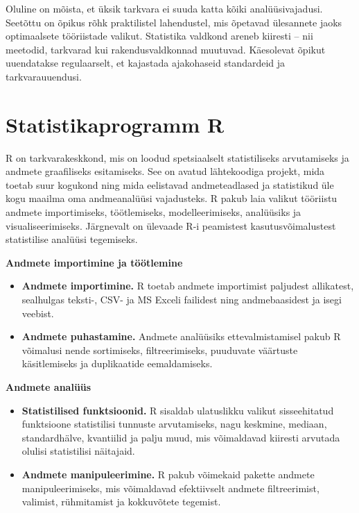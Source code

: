 \documentclass[
]{book}
\providecommand{\tightlist}{%
  \setlength{\itemsep}{0pt}\setlength{\parskip}{0pt}}
\theoremstyle{definition}
\theoremstyle{definition}
\theoremstyle{definition}
\theoremstyle{definition}
\theoremstyle{remark}
\begin{document}
Oluline on mõista, et üksik tarkvara ei suuda katta kõiki analüüsivajadusi. Seetõttu on õpikus rõhk praktilistel lahendustel, mis õpetavad ülesannete jaoks optimaalsete tööriistade valikut. Statistika valdkond areneb kiiresti -- nii meetodid, tarkvarad kui rakendusvaldkonnad muutuvad. Käesolevat õpikut uuendatakse regulaarselt, et kajastada ajakohaseid standardeid ja tarkvarauuendusi.

\section{Statistikaprogramm R}\label{statistikaprogramm-r}

R on tarkvarakeskkond, mis on loodud spetsiaalselt statistiliseks arvutamiseks ja andmete graafiliseks esitamiseks. See on avatud lähtekoodiga projekt, mida toetab suur kogukond ning mida eelistavad andmeteadlased ja statistikud üle kogu maailma oma andmeanalüüsi vajadusteks. R pakub laia valikut tööriistu andmete importimiseks, töötlemiseks, modelleerimiseks, analüüsiks ja visualiseerimiseks. Järgnevalt on ülevaade R-i peamistest kasutusvõimalustest statistilise analüüsi tegemiseks.

\textbf{Andmete importimine ja töötlemine}

\begin{itemize}
\tightlist
\item
  \textbf{Andmete importimine.} R toetab andmete importimist paljudest allikatest, sealhulgas teksti-, CSV- ja MS Exceli failidest ning andmebaasidest ja isegi veebist.
\item
  \textbf{Andmete puhastamine.} Andmete analüüsiks ettevalmistamisel pakub R võimalusi nende sortimiseks, filtreerimiseks, puuduvate väärtuste käsitlemiseks ja duplikaatide eemaldamiseks.
\end{itemize}

\textbf{Andmete analüüs}

\begin{itemize}
\tightlist
\item
  \textbf{Statistilised funktsioonid.} R sisaldab ulatuslikku valikut sisseehitatud funktsioone statistilisi tunnuste arvutamiseks, nagu keskmine, mediaan, standardhälve, kvantiilid ja palju muud, mis võimaldavad kiiresti arvutada olulisi statistilisi näitajaid.
\item
  \textbf{Andmete manipuleerimine.} R pakub võimekaid pakette andmete manipuleerimiseks, mis võimaldavad efektiivselt andmete filtreerimist, valimist, rühmitamist ja kokkuvõtete tegemist.
\end{itemize}
\end{document}
